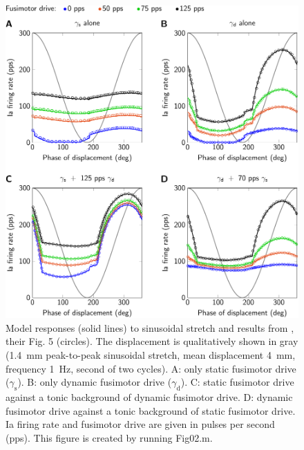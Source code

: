 \documentclass[fleqn,10pt]{physiome}
\begin{document}
\begin{figure}
    \includegraphics[width=\textwidth]{Figure2.pdf}
    \caption{Model responses (solid lines) to sinusoidal stretch and results from \citet{maltenfort2003}, their Fig. 5 (circles). The displacement is qualitatively shown in gray (\SI{1.4}{\milli\meter} peak-to-peak sinusoidal stretch, mean displacement \SI{4}{\milli\meter}, frequency \SI{1}{\Hz}, second of two cycles). A: only static fusimotor drive ($\gamma_\mathrm{s}$). B: only dynamic fusimotor drive ($\gamma_\mathrm{d}$). C: static fusimotor drive against a tonic background of dynamic fusimotor drive. D: dynamic fusimotor drive against a tonic background of static fusimotor drive. Ia firing rate and fusimotor drive are given in pulses per second (pps). This figure is created by running Fig02.m.}
    \label{fig:fig5}
\end{figure}
\end{document}
